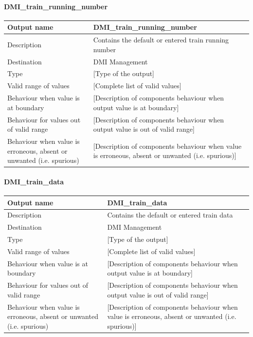 \paragraph{DMI\_train\_running\_number}

\begin{longtable}{p{}p{}}
\toprule
Output name				& DMI\_train\_running\_number \\
\midrule
Description				& Contains the default or entered train running number \\
\midrule
Destination				& DMI Management \\ 
\midrule
Type					& [Type of the output] \\
\midrule
Valid range of values	& [Complete list of valid values] \\
\midrule
Behaviour when value is at boundary	& [Description of components behaviour when output value is at boundary] \\
\midrule
Behaviour for values out of valid range	& [Description of components behaviour when output value is out of valid range] \\
\midrule
Behaviour when value is erroneous, absent or unwanted (i.e. spurious) & [Description of components behaviour when value is erroneous, absent or unwanted (i.e. spurious)] \\
\bottomrule
\end{longtable}

\paragraph{DMI\_train\_data}

\begin{longtable}{p{}p{}}
\toprule
Output name				& DMI\_train\_data \\
\midrule
Description				& Contains the default or entered train data \\
\midrule
Destination				& DMI Management \\ 
\midrule
Type					& [Type of the output] \\
\midrule
Valid range of values	& [Complete list of valid values] \\
\midrule
Behaviour when value is at boundary	& [Description of components behaviour when output value is at boundary] \\
\midrule
Behaviour for values out of valid range	& [Description of components behaviour when output value is out of valid range] \\
\midrule
Behaviour when value is erroneous, absent or unwanted (i.e. spurious) & [Description of components behaviour when value is erroneous, absent or unwanted (i.e. spurious)] \\
\bottomrule
\end{longtable}





%


